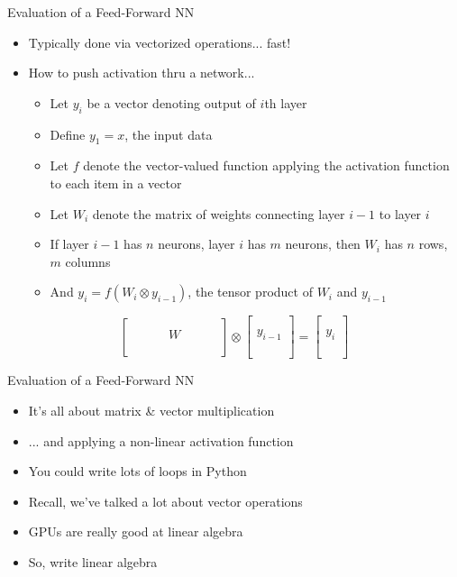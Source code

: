 \documentclass[aspectratio=169]{beamer}
\begin{document}
\begin{frame}{Evaluation of a Feed-Forward NN}

\begin{itemize}
	\item Typically done via vectorized operations... fast!
        \item How to push activation thru a network...
	\begin{itemize}
	\item Let $y_i$ be a  vector denoting output of $i$th layer
	\item Define $y_1 = x$, the input data
	\item Let $f$ denote the vector-valued function applying the activation function to each item in a vector
	\item Let $W_{i}$ denote the matrix of weights connecting layer $i-1$ to layer $i$
	\item If layer $i-1$ has $n$ neurons, layer $i$ has $m$ neurons, then $W_{i}$ has $n$ rows, $m$ columns
	\item And $y_i = f(W_{i} \otimes y_{i-1} )$, the tensor product of $W_i$ and $y_{i-1}$
        \end{itemize}
\end{itemize}
\[
\begin{bmatrix}
& & \\
 \hspace{2em} & W & \hspace{2em} \\
& & \\
\end{bmatrix}
\otimes
\begin{bmatrix}
 \\ \\
y_{i-1}  \\
 \\ \\
\end{bmatrix}
= 
\begin{bmatrix}
 \\ \\
y_{i}  \\
 \\ \\
\end{bmatrix}
\]
\end{frame}
\begin{frame}{Evaluation of a Feed-Forward NN}

\begin{itemize}
        \item It's all about matrix \& vector multiplication
        \item ... and applying a non-linear activation function
        \item You could write lots of loops in Python
        \item Recall, we've talked a lot about vector operations
        \item GPUs are really good at linear algebra
        \item So, write linear algebra
\end{itemize}
\end{frame}
\end{document}
